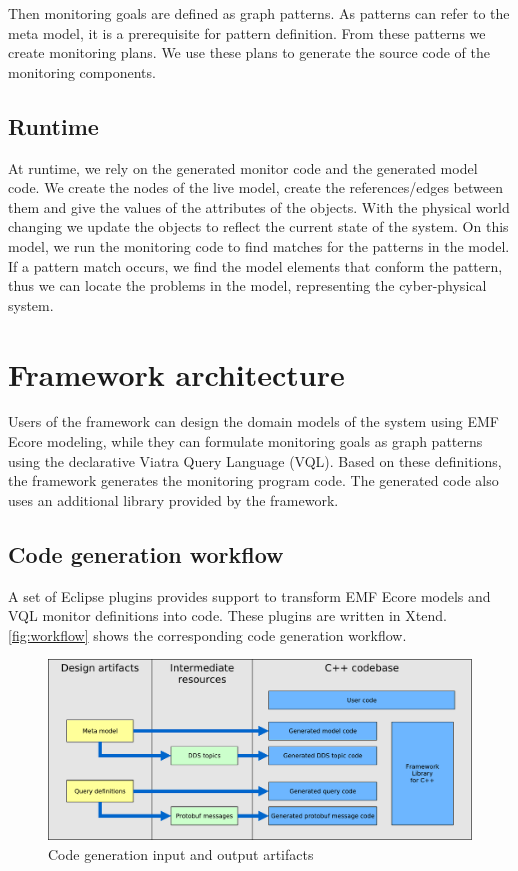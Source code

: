 Then monitoring goals are defined as graph patterns. 
As patterns can refer to the meta model, it is a prerequisite for pattern definition. 
From these patterns we create monitoring plans. 
We use these plans to generate the source code of the monitoring components.

\subsection{Runtime}

At runtime, we rely on the generated monitor code and the generated model code. 
We create the nodes of the live model, create the references/edges between them and give the values of the attributes of the objects. 
With the physical world changing we update the objects to reflect the current state of the system. 
On this model, we run the monitoring code to find matches for the patterns in the model. 
If a pattern match occurs, we find the model elements that conform the pattern, thus we can locate the problems in the model, representing the cyber-physical system.


\section{Framework architecture}

Users of the framework can design the domain models of the system using EMF Ecore modeling, while they can formulate monitoring goals as graph patterns using the declarative Viatra Query Language (VQL).
Based on these definitions, the framework generates the monitoring \cpp{} program code.
The generated code also uses an additional library provided by the framework.

\subsection{Code generation workflow}
A set of Eclipse plugins provides support to transform EMF Ecore models and VQL monitor definitions into \cpp{} code. 
These plugins are written in Xtend.
\autoref{fig:workflow} shows the corresponding code generation workflow.

\begin{figure}[H]
	\begin{center}
		\includegraphics[width=\textwidth]{figures/workflow.pdf}
		\caption{Code generation input and output artifacts}
		\label{fig:workflow}
	\end{center}
\end{figure}

